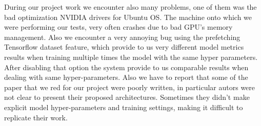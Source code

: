 During our project work we encounter also many problems, one of them was the bad optimization NVIDIA drivers for Ubuntu OS. The machine onto which we were performing our tests, very often crashes due to bad GPU's memory management. Also we encounter a very annoying bug using the prefetching Tensorflow dataset feature, which provide to us very different model metrics results when training multiple times the model with the same hyper parameters. After disabling that option the system provide to us comparable results when dealing with same hyper-parameters. Also we have to report that some of the paper that we red for our project were poorly written, in particular autors were not clear to present their proposed architectures. Sometimes they didn't make explicit model hyper-parameters and training settings, making it difficult to replicate their work.

